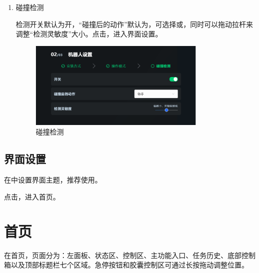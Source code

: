 \begin{enumerate}
\clearpage

\item 碰撞检测

	检测开关默认为开，“碰撞后的动作”默认为，可选择或，同时可以拖动拉杆来调整“检测灵敏度”大小。点击，进入界面设置。

	\begin{figure}[ht]
		\centering
		\includegraphics[width=0.8\textwidth]{screen/2-8.png}
		\caption{碰撞检测}
		\label{fig:碰撞检测}
	\end{figure}


\end{enumerate}


\subsection{界面设置}

在中设置界面主题，推荐使用。


点击，进入\LM 首页。


\section{首页}

在\LM 首页，页面分为：左面板、状态区、控制区、主功能入口、任务历史、底部控制箱以及顶部标题栏七个区域。急停按钮和胶囊控制区可通过长按拖动调整位置。

